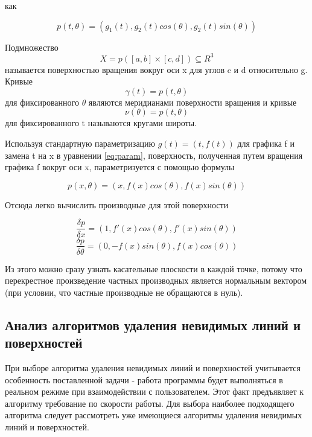 как

\begin{equation}
    p(t, \theta) = (g_1(t), g_2(t)cos(\theta), g_2(t)sin(\theta))\label{eq:param}
\end{equation}

Подмножество
\begin{equation}
    X = p([a, b] \times [c, d]) \subseteq R^3
\end{equation}
называется поверхностью вращения вокруг оси x для углов c и d относительно g.\newline
Кривые
\begin{equation}
    \gamma(t) = p(t, \theta)
\end{equation}
для фиксированного \(\theta\) являются меридианами поверхности вращения и кривые
\begin{equation}
    \nu(\theta) = p(t, \theta)
\end{equation}
для фиксированного t называются кругами широты.\newline

Используя стандартную параметризацию \(g(t) = (t,f(t))\) для
графика f и замена t на x в уравнении \ref{eq:param}, поверхность, полученная путем вращения графика f вокруг оси x,
параметризуется с помощью формулы

\begin{equation}
    p(x, \theta) = (x, f(x)cos(\theta), f(x)sin(\theta))
\end{equation}

Отсюда легко вычислить производные для этой поверхности

\begin{equation}
    \frac{\delta p}{\delta x} = (1, f'(x)cos(\theta), f'(x)sin(\theta))
\end{equation}
\begin{equation}
    \frac{\delta p}{\delta \theta} = (0, -f(x)sin(\theta), f(x)cos(\theta))
\end{equation}

Из этого можно сразу узнать касательные плоскости в каждой точке,
потому что перекрестное произведение частных производных является нормальным вектором
(при условии, что частные производные не обращаются в нуль).

\subsection{Анализ алгоритмов удаления невидимых линий и поверхностей}

При выборе алгоритма удаления невидимых линий и поверхностей учитывается особенность поставленной
задачи - работа программы будет выполняться в реальном режиме при взаимодействии с пользователем.
Этот факт предъявляет к алгоритму требование по скорости работы.
Для выбора наиболее подходящего алгоритма следует рассмотреть уже имеющиеся алгоритмы удаления невидимых линий и поверхностей.

